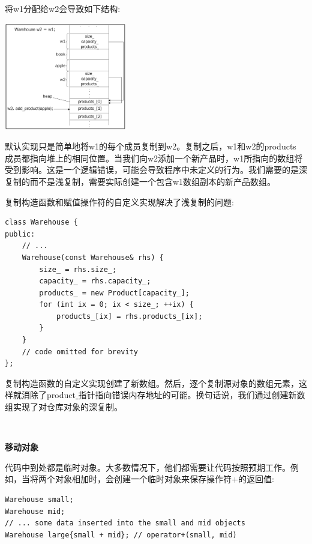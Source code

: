 将w1分配给w2会导致如下结构: \par

\begin{center}
	\includegraphics[width=0.4\textwidth]{content/Section-1/Chapter-3/9}
\end{center}

默认实现只是简单地将w1的每个成员复制到w2。复制之后，w1和w2的products\underline{ }成员都指向堆上的相同位置。当我们向w2添加一个新产品时，w1所指向的数组将受到影响。这是一个逻辑错误，可能会导致程序中未定义的行为。我们需要的是深复制的而不是浅复制，需要实际创建一个包含w1数组副本的新产品数组。 \par
复制构造函数和赋值操作符的自定义实现解决了浅复制的问题: \par

\begin{lstlisting}[caption={}]
class Warehouse {
public:
	// ...
	Warehouse(const Warehouse& rhs) {
		size_ = rhs.size_;
		capacity_ = rhs.capacity_;
		products_ = new Product[capacity_];
		for (int ix = 0; ix < size_; ++ix) {
			products_[ix] = rhs.products_[ix];
		}
	}
	// code omitted for brevity
};
\end{lstlisting}

复制构造函数的自定义实现创建了新数组。然后，逐个复制源对象的数组元素，这样就消除了product\underline{ }指针指向错误内存地址的可能。换句话说，我们通过创建新数组实现了对仓库对象的深复制。 \par

\noindent\textbf{}\ \par
\textbf{移动对象} \ \par
代码中到处都是临时对象。大多数情况下，他们都需要让代码按照预期工作。例如，当将两个对象相加时，会创建一个临时对象来保存操作符+的返回值: \par

\begin{lstlisting}[caption={}]
Warehouse small;
Warehouse mid;
// ... some data inserted into the small and mid objects
Warehouse large{small + mid}; // operator+(small, mid)
\end{lstlisting}

